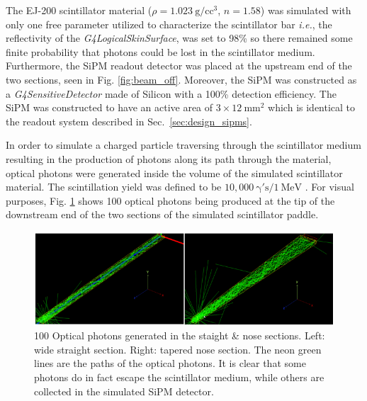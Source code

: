 The EJ-200 scintillator material ($\rho=1.023~\mathrm{g/cc^{3}}$, $n = 1.58$) \cite{ej200_specs} was simulated with only one free parameter utilized to characterize the scintillator bar \textit{i.e.}, the reflectivity of the \textit{G4LogicalSkinSurface}, was set to 98\% so there remained some finite probability that photons could be lost in the scintillator medium.  Furthermore, the SiPM readout detector was placed at the upstream end of the two sections, seen in Fig. \ref{fig:beam_off}.  Moreover, the SiPM was constructed as a \textit{G4SensitiveDetector} made of Silicon with a 100\% detection efficiency.  The SiPM was constructed to have an active area of $\mathrm{3 \times 12~mm^2}$ which is identical to the readout system described in Sec.~\ref{sec:design_sipms}.

In order to simulate a charged particle traversing through the scintillator medium resulting in the production of photons along its path through the material, optical photons were generated inside the volume of the simulated scintillator material.  The scintillation yield was defined to be $\mathrm{10,000~ \gamma 's / 1~MeV}$ \cite{ej200_specs}. For visual purposes, Fig. \ref{fig:100_events} shows 100 optical photons being produced at the tip of the downstream end of the two sections of the simulated scintillator paddle.

	\begin{figure}[!htb]
	\centering
	\includegraphics[width=1.0\columnwidth]{simulation/figs/100_events}
	\caption{100 Optical photons generated in the staight \& nose sections.  Left: wide straight section.  Right: tapered nose section.  The neon green lines are the paths of the optical photons.  It is clear that some photons do in fact escape the scintillator medium, while others are collected in the simulated SiPM detector.}
	\label{fig:100_events}
	\end{figure}

